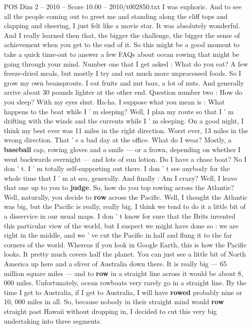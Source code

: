 \begin{textsample}{POS Dim 2 – 2010 – Score 10.00 – 2010/t002850.txt}
I was euphoric.
And to see all the people coming out to greet me and standing along the cliff tops and clapping and cheering, I just felt like a movie star.
It was absolutely wonderful.
And I really learned then that, the bigger the challenge, the bigger the sense of achievement when you get to the end of it.
So this might be a good moment to take a quick time-out to answer a few FAQs about ocean rowing that might be going through your mind.
Number one that I get asked : What do you eat?
A few freeze-dried meals, but mostly I try and eat much more unprocessed foods.
So I grow my own beansprouts.
I eat fruits and nut bars, a lot of nuts.
And generally arrive about 30 pounds lighter at the other end.
Question number two : How do you sleep?
With my eyes shut.
Ha-ha.
I suppose what you mean is : What happens to the boat while I ' m sleeping?
Well, I plan my route so that I ' m drifting with the winds and the currents while I ' m sleeping.
On a good night, I think my best ever was 11 miles in the right direction.
Worst ever, 13 miles in the wrong direction.
That ' s a bad day at the office.
What do I wear?
Mostly, a \textbf{baseball} cap, rowing gloves and a smile — or a frown, depending on whether I went backwards overnight — and lots of sun lotion.
Do I have a chase boat?
No I don ' t.
I ' m totally self-supporting out there.
I don ' t see anybody for the whole time that I ' m at sea, generally.
And finally : Am I crazy?
Well, I leave that one up to you to \textbf{judge}.
So, how do you top rowing across the Atlantic?
Well, naturally, you decide to \textbf{row} across the Pacific.
Well, I thought the Atlantic was big, but the Pacific is really, really big.
I think we tend to do it a little bit of a disservice in our usual maps.
I don ' t know for sure that the Brits invented this particular view of the world, but I suspect we might have done so : we are right in the middle, and we ' ve cut the Pacific in half and flung it to the far corners of the world.
Whereas if you look in Google Earth, this is how the Pacific looks.
It pretty much covers half the planet.
You can just see a little bit of North America up here and a sliver of Australia down there.
It is really big — 65 million square miles — and to \textbf{row} in a straight line across it would be about 8, 000 miles.
Unfortunately, ocean rowboats very rarely go in a straight line.
By the time I get to Australia, if I get to Australia, I will have \textbf{rowed} probably nine or 10, 000 miles in all.
So, because nobody in their straight mind would \textbf{row} straight past Hawaii without dropping in, I decided to cut this very big undertaking into three segments.

\end{textsample}
